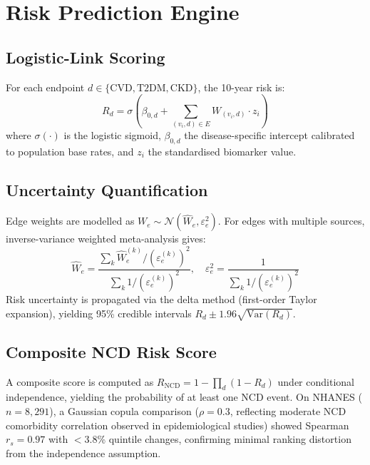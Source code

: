 \documentclass[runningheads]{llncs}
\begin{document}
\section{Risk Prediction Engine}\label{sec:risk}

\subsection{Logistic-Link Scoring}\label{sec:logistic}

For each endpoint $d \in \{\text{CVD}, \text{T2DM}, \text{CKD}\}$,
the 10-year risk is:
\begin{equation}\label{eq:risk}
R_d = \sigma\!\left(\beta_{0,d} + \sum_{(v_i, d) \in E} W_{(v_i,d)} \cdot z_i\right)
\end{equation}
where $\sigma(\cdot)$ is the logistic sigmoid, $\beta_{0,d}$ the
disease-specific intercept calibrated to population base rates, and
$z_i$ the standardised biomarker value.

\subsection{Uncertainty Quantification}\label{sec:uncert}

Edge weights are modelled as $W_e \sim \mathcal{N}(\hat{W}_e,
\varepsilon_e^2)$.
For edges with multiple sources, inverse-variance weighted
meta-analysis gives:
\begin{equation}\label{eq:meta}
\hat{W}_e = \frac{\sum_k \hat{W}_e^{(k)} / (\varepsilon_e^{(k)})^2}
{\sum_k 1 / (\varepsilon_e^{(k)})^2}, \quad
\varepsilon_e^2 = \frac{1}{\sum_k 1 / (\varepsilon_e^{(k)})^2}
\end{equation}
Risk uncertainty is propagated via the delta method (first-order
Taylor expansion), yielding 95\% credible intervals
$R_d \pm 1.96\sqrt{\mathrm{Var}(R_d)}$.

\subsection{Composite NCD Risk Score}\label{sec:composite}

A composite score is computed as
$R_{\mathrm{NCD}} = 1 - \prod_{d} (1 - R_d)$
under conditional independence, yielding the probability of at least
one NCD event.
On NHANES ($n = 8{,}291$), a Gaussian copula comparison
($\rho = 0.3$, reflecting moderate NCD comorbidity correlation
observed in epidemiological studies) showed Spearman $r_s = 0.97$
with $<$3.8\% quintile changes, confirming minimal ranking
distortion from the independence assumption.
\end{document}
